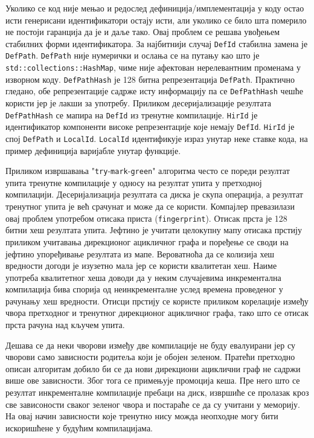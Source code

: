 Уколико се код није мењао и редослед дефиниција/имплементација у коду остао исти генерисани 
идентификатори остају исти, али уколико се било шта померило не постоји гаранција да је и даље тако. Овај проблем се решава 
увођењем стабилних форми идентификатора. За најбитнији случај \verb|DefId| стабилна замена је \verb|DefPath|. \verb|DefPath| није нумерички 
и ослања се на путању као што је \verb|std::collections::HashMap|, чиме није афектован нерелевантним променама у изворном коду. 
\verb|DefPathHash| је 128 битна репрезентација \verb|DefPath|. Практично гледано, обе репрезентације садрже исту информацију па се 
\verb|DefPathHash| чешће користи јер је лакши за употребу. Приликом десеријализације резултата \verb|DefPathHash| се мапира на 
\verb|DefId| из тренутне компилације. \verb|HirId| је идентификатор компоненти високе репрезентације које немају \verb|DefId|. 
\verb|HirId| је спој \verb|DefPath| и \verb|LocalId|. \verb|LocalId| идентификује израз унутар неке ставке кода, на пример 
дефиниција варијабле унутар функције.

Приликом извршавања "\verb|try|-\verb|mark|-\verb|green|" алгоритма често се пореди резултат упита тренутне компилације у односу 
на резултат упита у претходној компилацији. Десеријализација резултата са диска је скупа операција, а резултат тренутног упита је 
већ срачунат и може да се користи. Компајлер превазилази овај проблем употребом отисака приста (\verb|fingerprint|). Отисак прста 
је 128 битни хеш резултата упита. Јефтино је учитати целокупну мапу отисака прстију приликом учитавања дирекционог ацикличног графа 
и поређење се своди на јефтино упоређивање резултата из мапе. Вероватноћа да се колизија хеш вредности догоди је изузетно мала 
јер се користи квалитетан хеш. Наиме употреба квалитетног хеша доводи да у неким случајевима инкрементална компилација бива 
спорија од неинкременталне услед времена проведеног у рачунању хеш вредности. Отисци прстију се користе приликом корелације 
између чвора претходног и тренутног дирекционог ацикличног графа, тако што се отисак прста рачуна над кључем упита.

Дешава се да неки чворови између две компилације не буду евалуирани јер су чворови само зависности родитеља који је обојен 
зеленом. Пратећи претходно описан алгоритам добило би се да нови дирекциони ациклични граф не садржи више ове зависности. Због 
тога се примењује промоција кеша. Пре него што се резултат инкременталне компилације пребаци на диск, извршиће се пролазак 
кроз све зависоности сваког зеленог чвора и постараће се да су учитани у меморију. На овај начин зависности које тренутно 
нису можда неопходне могу бити искоришћене у будућим компилацијама. 

